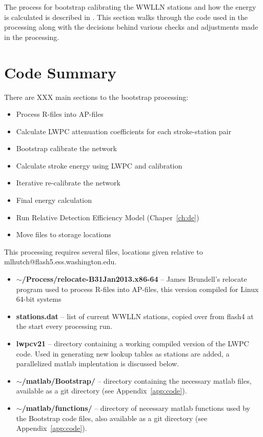 The process for bootstrap calibrating the WWLLN stations and how the energy is calculated is described in \citet{Hutchins2012}.
This section walks through the code used in the processing along with the decisions behind various checks and adjustments made in the processing.

\section{Code Summary}

There are XXX main sections to the bootstrap processing:

\begin{itemize}
	\item{Process R-files into AP-files}
	\item{Calculate LWPC attenuation coefficients for each stroke-station pair}
	\item{Bootstrap calibrate the network}
	\item{Calculate stroke energy using LWPC and calibration}
	\item{Iterative re-calibrate the network}
	\item{Final energy calculation}
	\item{Run Relative Detection Efficiency Model (Chaper~\ref{ch:de})}
	\item{Move files to storage locations}
\end{itemize}

This processing requires several files, locations given relative to mlhutch@flash5.ess.washington.edu.

\begin{itemize}
	\item{\textbf{$\sim$/Process/relocate-B31Jan2013.x86-64} -- James Brundell's relocate program used to process R-files into AP-files, this version compiled for Linux 64-bit systems}
	\item{\textbf{stations.dat} -- list of current WWLLN stations, copied over from flash4 at the start every processing run.}
	\item{\textbf{lwpcv21} -- directory containing a working compiled version of the LWPC code. Used in generating new lookup tables as stations are added, a parallelized matlab implentation is discussed below.}
	\item{\textbf{$\sim$/matlab/Bootstrap/} -- directory containing the necessary matlab files, available as a git directory (see Appendix~\ref{app:code}).}
	\item{\textbf{$\sim$/matlab/functions/} -- directory of necessary matlab functions used by the Bootstrap code files, also available as a git directory (see Appendix~\ref{app:code}).}
\end{itemize}

